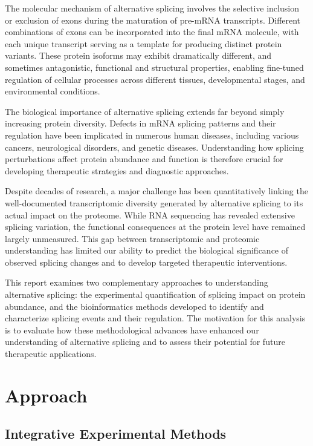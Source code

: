 \documentclass[12pt,a4paper]{article}
\begin{document}
The molecular mechanism of alternative splicing involves the selective inclusion or exclusion of exons during the maturation of pre-mRNA transcripts. Different combinations of exons can be incorporated into the final mRNA molecule, with each unique transcript serving as a template for producing distinct protein variants. These protein isoforms may exhibit dramatically different, and sometimes antagonistic, functional and structural properties, enabling fine-tuned regulation of cellular processes across different tissues, developmental stages, and environmental conditions.

The biological importance of alternative splicing extends far beyond simply increasing protein diversity. Defects in mRNA splicing patterns and their regulation have been implicated in numerous human diseases, including various cancers, neurological disorders, and genetic diseases. Understanding how splicing perturbations affect protein abundance and function is therefore crucial for developing therapeutic strategies and diagnostic approaches.

Despite decades of research, a major challenge has been quantitatively linking the well-documented transcriptomic diversity generated by alternative splicing to its actual impact on the proteome. While RNA sequencing has revealed extensive splicing variation, the functional consequences at the protein level have remained largely unmeasured. This gap between transcriptomic and proteomic understanding has limited our ability to predict the biological significance of observed splicing changes and to develop targeted therapeutic interventions.

This report examines two complementary approaches to understanding alternative splicing: the experimental quantification of splicing impact on protein abundance, and the bioinformatics methods developed to identify and characterize splicing events and their regulation. The motivation for this analysis is to evaluate how these methodological advances have enhanced our understanding of alternative splicing and to assess their potential for future therapeutic applications.

\section{Approach}

\subsection{Integrative Experimental Methods}
\end{document}
